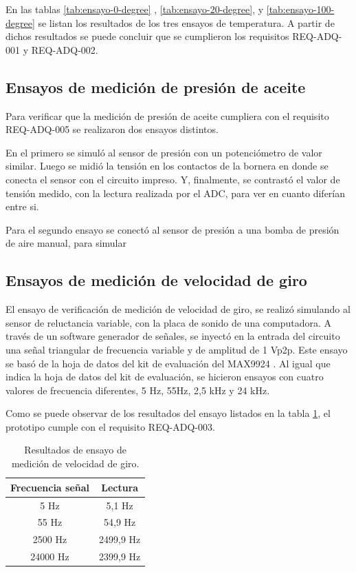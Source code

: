 En las tablas \ref{tab:ensayo-0-degree} , \ref{tab:ensayo-20-degree}, y \ref{tab:ensayo-100-degree} se listan los resultados de los tres ensayos de temperatura. A partir de dichos resultados se puede concluir que se cumplieron los requisitos REQ-ADQ-001 y REQ-ADQ-002.

\subsection{Ensayos de medición de presión de aceite}

Para verificar que la medición de presión de aceite cumpliera con el requisito REQ-ADQ-005 se realizaron dos ensayos distintos.

En el primero se simuló al sensor de presión con un potenciómetro de valor similar. Luego se midió la tensión en los contactos de la bornera en donde se conecta el sensor con el circuito impreso. Y, finalmente, se contrastó el valor de tensión medido, con la lectura realizada por el ADC, para ver en cuanto diferían entre si.

Para el segundo ensayo se conectó al sensor de presión a una bomba de presión de aire manual, para simular

\subsection{Ensayos de medición de velocidad de giro}

El ensayo de verificación de medición de velocidad de giro, se realizó simulando al sensor de reluctancia variable, con la placa de sonido de una computadora. A través de un software generador de señales, se inyectó en la entrada del circuito una señal triangular de frecuencia variable y de amplitud de 1 Vp2p. Este ensayo se basó de la hoja de datos del kit de evaluación del MAX9924 \cite{max9924evk}. Al igual que indica la hoja de datos del kit de evaluación, se hicieron ensayos con cuatro valores de frecuencia diferentes, 5 Hz, 55Hz, 2,5 kHz y 24 kHz.

Como se puede observar de los resultados del ensayo listados en la tabla \ref{tab:ensayo-rpm}, el prototipo cumple con el requisito REQ-ADQ-003.

\begin{table}[htpb]
	\centering
	\caption{Resultados de ensayo de medición de velocidad de giro.}
	\centering
	\begin{tabular}{c c}    
		\toprule
		\textbf{Frecuencia señal }     & \textbf{Lectura} \\
		\midrule
		5 Hz		&   5,1 Hz \\
		55 Hz		&   54,9 Hz \\
		2500 Hz		&   2499,9 Hz \\
		24000 Hz	&   2399,9 Hz \\
		\bottomrule
	\end{tabular}
	\label{tab:ensayo-rpm}
\end{table}

